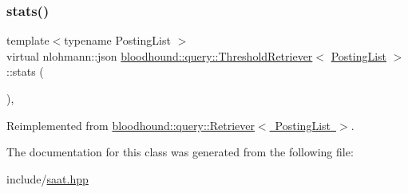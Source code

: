 \mbox{\label{classbloodhound_1_1query_1_1ThresholdRetriever_aa21e5b44d70bfdf058e5f9c5a1abc008}} 
\subsubsection{\texorpdfstring{stats()}{stats()}}
{\footnotesize\ttfamily template$<$typename Posting\+List $>$ \\
virtual nlohmann\+::json \mbox{\hyperlink{classbloodhound_1_1query_1_1ThresholdRetriever}{bloodhound\+::query\+::\+Threshold\+Retriever}}$<$ \mbox{\hyperlink{classbloodhound_1_1PostingList}{Posting\+List}} $>$\+::stats (\begin{DoxyParamCaption}{ }\end{DoxyParamCaption})\hspace{0.3cm}{\ttfamily [inline]}, {\ttfamily [virtual]}}



Reimplemented from \mbox{\hyperlink{classbloodhound_1_1query_1_1Retriever_a58da32a5139b980ba874f8b5e6bb89ec}{bloodhound\+::query\+::\+Retriever$<$ Posting\+List $>$}}.



The documentation for this class was generated from the following file\+:\begin{DoxyCompactItemize}
\item 
include/\mbox{\hyperlink{saat_8hpp}{saat.\+hpp}}\end{DoxyCompactItemize}
